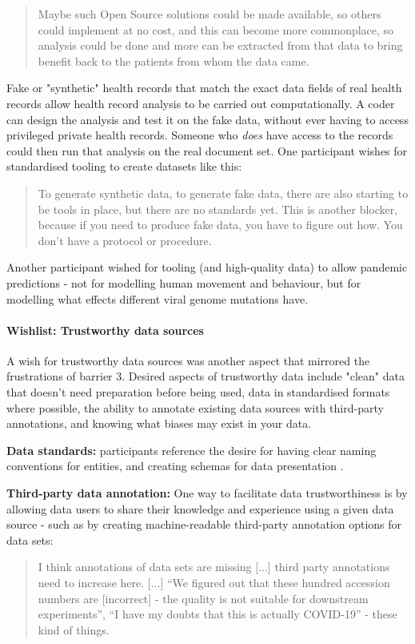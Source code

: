 \documentclass{CUP-JNL-DAP}%
\begin{document}
\blockquote{Maybe such Open Source solutions could be made available, so others could implement at no cost, and this can become more commonplace, so analysis could be done and more can be extracted from that data to bring benefit back to the patients from whom the data came.}

Fake or "synthetic" health records that match the exact data fields of real health records allow health record analysis to be carried out computationally. A coder can design the analysis and test it on the fake data, without ever having to access privileged private health records. Someone who \textit{does} have access to the records could then run that analysis on the real document set. One participant wishes for standardised tooling to create datasets like this: 

\blockquote{To generate synthetic data, to generate fake data, there are also starting to be tools in place, but there are no standards yet. This is another blocker, because if you need to produce fake data, you have to figure out how. You don't have a protocol or procedure.}

Another participant wished for tooling (and high-quality data) to allow pandemic predictions - not for modelling human movement and behaviour, but for modelling what effects different viral genome mutations have. 

\paragraph{Wishlist: Trustworthy data sources}

A wish for trustworthy data sources was another aspect that mirrored the frustrations of barrier 3. Desired aspects of trustworthy data include "clean" data that doesn't need preparation before being used, data in standardised formats where possible, the ability to annotate existing data sources with third-party annotations, and knowing what biases may exist in your data.

\textbf{Data standards:} participants reference the desire for having clear naming conventions for entities, and creating schemas for data presentation .

\textbf{Third-party data annotation:} One way to facilitate data trustworthiness is by allowing data users to share their knowledge and experience using a given data source - such as by creating machine-readable third-party annotation options for data sets: 

\blockquote{I think annotations of data sets are missing [...] third party annotations need to increase here. [...] \enquote{We figured out that these hundred accession numbers are [incorrect] - the quality is not suitable for downstream experiments}, \enquote{I have my doubts that this is actually COVID-19} - these kind of things.}
\end{document}
